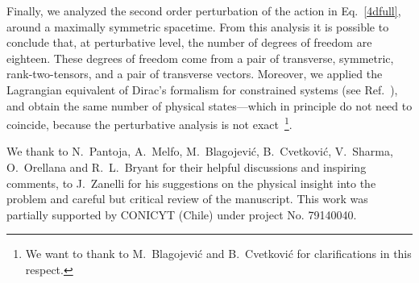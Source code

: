 \documentclass[aps,prd,12pt,twocolumn,superscriptaddress,showpacs,showkeys,reprint%
]{revtex4-1}
\renewcommand{\(}{\left(}
\renewcommand{\)}{\right)}
\renewcommand{\[}{\left[}
\renewcommand{\]}{\right]}
\begin{document}
Finally, we analyzed the second order perturbation of the action in Eq.~\eqref{4dfull}, around a maximally symmetric spacetime. From this analysis it is possible to conclude that, at perturbative level, the number of degrees of freedom are eighteen. These degrees of freedom come from a pair of transverse, symmetric, rank-two-tensors, and a pair of transverse vectors. Moreover, we applied the Lagrangian equivalent of Dirac's formalism for constrained systems (see Ref.~\cite{Diaz:2014yua}), and obtain the same number of physical states---which in principle do not need to coincide, because the perturbative analysis is not exact~\footnote{We want to thank to M.~Blagojevi\'c and B.~Cvetkovi\'c for clarifications in this respect.}.


\begin{acknowledgments}
  We thank to N.~Pantoja, A.~Melfo, M.~Blagojevi\'c, B.~Cvetkovi\'c, V.~Sharma, O.~Orellana and R.~L.~Bryant for their helpful discussions and inspiring comments, to J.~Zanelli for his suggestions on the physical insight into the problem and careful but critical review of the manuscript.
  This work was partially supported by CONICYT (Chile) under project No. 79140040.
\end{acknowledgments}

\appendix





\end{document}
